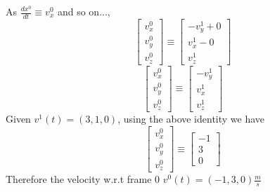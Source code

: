 \documentclass[12pt]{article}
\begin{document}
As $\frac{dx^0}{dt} \equiv v_x^0$ and so on...,
\[
  \begin{bmatrix} v_x^0 \\ v_y^0 \\ v_z^0\end{bmatrix} \equiv
  \begin{bmatrix} -v_y^1 + 0 \\ v_x^1 - 0 \\ v_z^1\end{bmatrix}
\]
\[
  \begin{bmatrix} v_x^0 \\ v_y^0 \\ v_z^0\end{bmatrix} \equiv
  \begin{bmatrix} -v_y^1 \\ v_x^1 \\ v_z^1\end{bmatrix}
\]
Given $v^1(t) = (3, 1, 0)$, using the above identity we have
\[
  \begin{bmatrix} v_x^0 \\ v_y^0 \\ v_z^0\end{bmatrix} \equiv
  \begin{bmatrix} -1 \\ 3 \\ 0\end{bmatrix}
\]
Therefore the velocity w.r.t frame 0 $v^0(t) = (-1, 3, 0) \frac{m}{s}$

\pagebreak

\section{}
\end{document}
